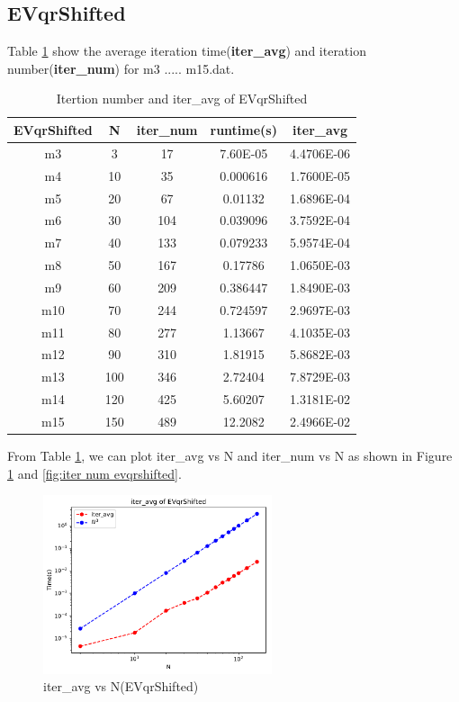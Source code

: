\documentclass{article}
\begin{document}
\subsection{EVqrShifted}
\label{sec:evqrshifted}
Table \ref{tab:iter evqrshifted} show the average iteration time(\textbf{iter\_avg}) and iteration number(\textbf{iter\_num})
for m3 ..... m15.dat.
\begin{table}[H]
    \begin{center}
        \begin{tabular}{|c|c|c|c|c|}
            \hline
            EVqrShifted & N & iter\_num & runtime(s) & iter\_avg \\ \hline
            m3 & 3 & 17 & 7.60E-05 & 4.4706E-06 \\ \hline
            m4 & 10 & 35 & 0.000616 & 1.7600E-05 \\ \hline
            m5 & 20 & 67 & 0.01132 & 1.6896E-04 \\ \hline
            m6 & 30 & 104 & 0.039096 & 3.7592E-04 \\ \hline
            m7 & 40 & 133 & 0.079233 & 5.9574E-04 \\ \hline
            m8 & 50 & 167 & 0.17786 & 1.0650E-03 \\ \hline
            m9 & 60 & 209 & 0.386447 & 1.8490E-03 \\ \hline
            m10 & 70 & 244 & 0.724597 & 2.9697E-03 \\ \hline
            m11 & 80 & 277 & 1.13667 & 4.1035E-03 \\ \hline
            m12 & 90 & 310 & 1.81915 & 5.8682E-03 \\ \hline
            m13 & 100 & 346 & 2.72404 & 7.8729E-03 \\ \hline
            m14 & 120 & 425 & 5.60207 & 1.3181E-02 \\ \hline
            m15 & 150 & 489 & 12.2082 & 2.4966E-02 \\ \hline
        \end{tabular}
    \end{center}
    \caption{Itertion number and iter\_avg of EVqrShifted}
    \label{tab:iter evqrshifted}
\end{table}
From Table \ref{tab:iter evqrshifted}, we can plot iter\_avg vs N and iter\_num vs N as shown in Figure \ref{fig:iter avg evqrshifted} 
and \ref{fig:iter num evqrshifted}.
\begin{figure}[H]
    \centering
    \includegraphics[width=0.6\textwidth]{src/iter_avg_shifted.pdf}
    \caption{iter\_avg vs N(EVqrShifted)}
    \label{fig:iter avg evqrshifted}
\end{figure}
\end{document}
